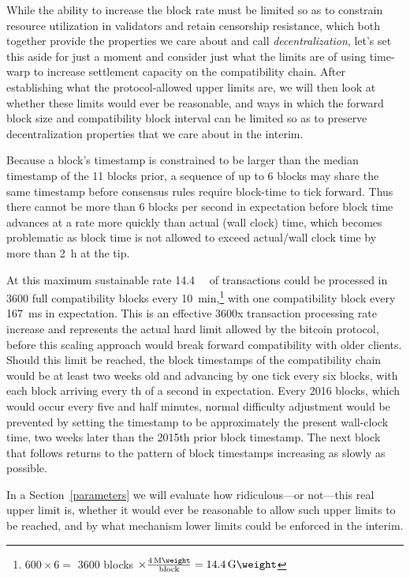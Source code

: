 While the ability to increase the block rate must be limited so as to
constrain resource utilization in validators and retain censorship
resistance, which both together provide the properties we care about
and call \emph{decentralization}, let's set this aside for just a
moment and consider just what the limits are of using time-warp to
increase settlement capacity on the compatibility chain.  After
establishing what the protocol-allowed upper limits are, we will then
look at whether these limits would ever be reasonable, and ways in
which the forward block size and compatibility block interval can be
limited so as to preserve decentralization properties that we care
about in the interim.

Because a block's timestamp is constrained to be larger than the
median timestamp of the \num{11} blocks prior, a sequence of up to
\num{6} blocks may share the same timestamp before consensus rules
require block-time to tick forward.  Thus there cannot be more than
\num{6} blocks per second in expectation before block time advances at
a rate more quickly than actual (wall clock) time, which becomes
problematic as block time is not allowed to exceed actual/wall clock
time by more than \SI{2}{\hour} at the tip.

At this maximum sustainable rate \SI{14.4}{\giga\weight} of
transactions could be processed in \num{3600} full compatibility
blocks every \SI{10}{\minute},\footnote{$600 \times 6 =$ \num{3600}
  blocks $\times \frac{\SI{4}{\mega\weight}}{\mathrm{block}} =
  \SI{14.4}{\giga\weight}$} with one compatibility block every
\SI{167}{\milli\second} in expectation.  This is an effective
\num{3600}x transaction processing rate increase and represents the
actual hard limit allowed by the bitcoin protocol, before this scaling
approach would break forward compatibility with older clients.  Should
this limit be reached, the block timestamps of the compatibility chain
would be at least two weeks old and advancing by one tick every six
blocks, with each block arriving every th of a second in
expectation.  Every \num{2016} blocks, which would occur every five
and half minutes, normal difficulty adjustment would be prevented by
setting the timestamp to be approximately the present wall-clock time,
two weeks later than the \num{2015}th prior block timestamp.  The next
block that follows returns to the pattern of block timestamps
increasing as slowly as possible.

In a Section~\ref{parameters} we will evaluate how ridiculous---or
not---this real upper limit is, whether it would ever be reasonable to
allow such upper limits to be reached, and by what mechanism lower
limits could be enforced in the interim.
